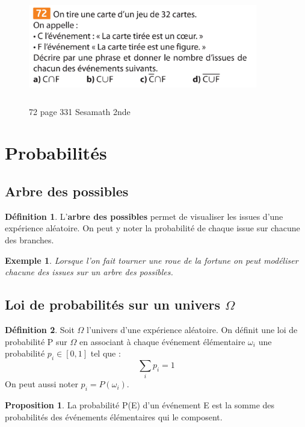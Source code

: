 \documentclass[a4paper,12pt,final]{article}
\newtheorem{Ex}{Exemple}[section]
\theoremstyle{theorem}
\theoremstyle{definition}
\theoremstyle{definition}
\newtheorem{Propos}{Proposition}[section]
\theoremstyle{definition}
\newtheorem{Def}{Définition}[section]
\begin{document}
\begin{figure}[h!]
	\centering
	\includegraphics[width=10cm,height=5cm]{Sesamath2de_72p331.pdf}
	\caption{72 page 331 Sesamath 2nde}
	\label{fig:sesamath2de72p331}
\end{figure}
	
\section{Probabilités}
	\subsection{Arbre des possibles}
		\begin{Def}
			L'\textbf{arbre des possibles} permet de visualiser les issues d'une expérience aléatoire. On peut y noter la probabilité de chaque issue sur chacune des branches.
		\end{Def}
	
		\begin{Ex}
			Lorsque l'on fait tourner une roue de la fortune on peut modéliser chacune des issues sur un arbre des possibles.
		\end{Ex}
	\subsection{Loi de probabilités sur un univers $\Omega$}
	
		\begin{Def}
			Soit $\Omega$ l'univers d'une expérience aléatoire. On définit une loi de probabilité P sur $\Omega$ en associant à chaque événement élémentaire $\omega_{i}$ une probabilité $p_{i} \in [0,1]$ tel que :
			\[\sum_{i}p_{i} = 1\]
			On peut aussi noter $p_{i} = P(\omega_{i})$.
		\end{Def}
		
		\begin{Propos}
			La probabilité P(E) d'un événement E est la somme des probabilités des événements élémentaires qui le composent.
		\end{Propos}
	
\end{document}
